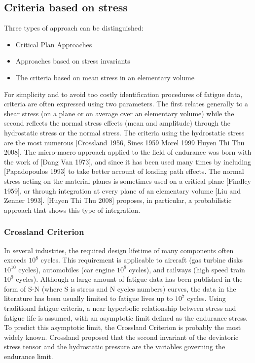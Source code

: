\documentclass[3p,times,procedia,number]{elsarticle}
\begin{document}
\subsection{Criteria based on stress}
Three types of approach can be distinguished:
\begin{itemize}
	\item Critical Plan Approaches
	\item Approaches based on stress invariants
	\item The criteria based on mean stress in an elementary volume
\end{itemize}
For simplicity and to avoid too costly identification procedures of fatigue data, criteria are often expressed using two
parameters. The first relates generally to a shear stress (on a plane or on average over an elementary volume) while
the second reflects the normal stress effects (mean and amplitude) through the hydrostatic stress or the normal stress.
The criteria using the hydrostatic stress are the most numerous [Crossland 1956, Sines 1959 Morel 1999 Huyen Thi
Thu 2008]. The micro-macro approach applied to the field of endurance was born with the work of [Dang Van
1973], and since it has been used many times by including [Papadopoulos 1993] to take better account of loading path effects. The normal stress acting on the material planes is sometimes used on a critical plane [Findley 1959], or
through integration at every plane of an elementary volume [Liu and Zenner 1993]. [Huyen Thi Thu 2008] proposes, in
particular, a probabilistic approach that shows this type of integration.


\subsubsection{Crossland Criterion}
In several industries, the required design lifetime of many components often exceeds $ 10^8 $ cycles. This requirement is applicable to aircraft (gas turbine disks $ 10^{10} $ cycles), automobiles (car engine $ 10^8 $ cycles), and railways (high speed train $ 10^9 $ cycles). Although a large amount of fatigue data has been published in the form of S-N (where S is stress and N cycles numbers) curves, the data in the literature has been usually limited to fatigue lives up to $ 10^7 $ cycles. Using traditional fatigue criteria, a near hyperbolic relationship between stress and fatigue life is assumed, with an asymptotic limit defined as the endurance stress. To predict this asymptotic limit, the Crossland Criterion is probably the most widely known. Crossland proposed that the second invariant of the deviatoric stress tensor and the hydrostatic pressure are the variables governing the endurance limit. 
\end{document}

